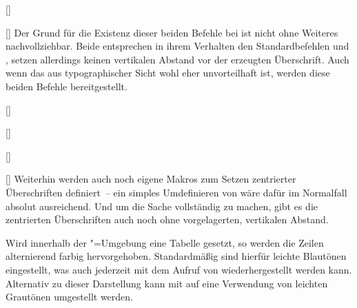 \begin{Bundle*}{}
\begin{Declaration}{%
  []%
}
\begin{Declaration}{%
  []%
}
\printdeclarationlist%
%
Der Grund für die Existenz dieser beiden Befehle bei  ist 
nicht ohne Weiteres nachvollziehbar. Beide entsprechen in ihrem Verhalten den 
Standardbefehlen  und , setzen allerdings 
keinen vertikalen Abstand vor der erzeugten Überschrift. Auch wenn das aus 
typographischer Sicht wohl eher unvorteilhaft ist, werden diese beiden Befehle 
bereitgestellt.
\end{Declaration}
\end{Declaration}

\begin{Declaration}{%
  []%
}
\begin{Declaration}{%
  []%
}
\begin{Declaration}{%
  []%
}
\begin{Declaration}{%
  []%
}
\printdeclarationlist%
%
Weiterhin werden auch noch eigene Makros zum Setzen zentrierter Überschriften 
definiert~-- ein simples Umdefinieren von  wäre dafür im 
Normalfall absolut ausreichend. Und um die Sache vollständig zu machen, gibt es 
die zentrierten Überschriften auch noch ohne vorgelagerten, vertikalen Abstand.
\end{Declaration}
\end{Declaration}
\end{Declaration}
\end{Declaration}

\begin{Declaration}{}
\begin{Declaration}{}
\begin{Declaration}{}
\printdeclarationlist%
%
Wird innerhalb der "=Umgebung eine Tabelle gesetzt, 
so werden die Zeilen alternierend farbig hervorgehoben. Standardmäßig sind 
hierfür leichte Blautönen eingestellt, was auch jederzeit mit dem Aufruf von 
 wiederhergestellt werden kann. Alternativ zu dieser 
Darstellung kann mit  auf eine Verwendung von leichten 
Grautönen umgestellt werden.
\end{Declaration}
\end{Declaration}
\end{Declaration}


\end{Bundle*}
